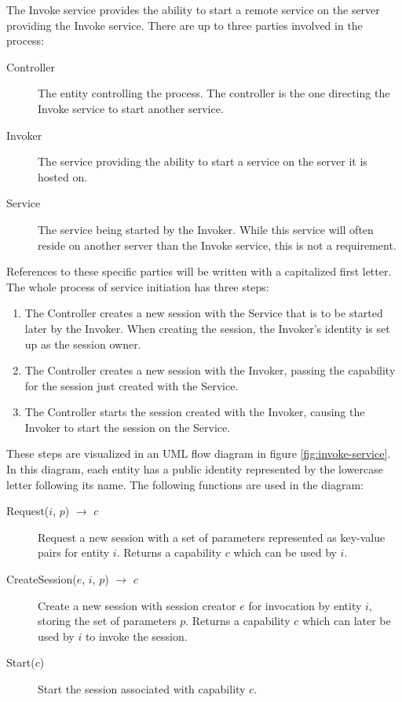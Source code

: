 The Invoke service provides the ability to start a remote service on the server providing the Invoke service.
There are up to three parties involved in the process:
\begin{description}
    \item[Controller]
        The entity controlling the process.
        The controller is the one directing the Invoke service to start another service.
    \item[Invoker]
        The service providing the ability to start a service on the server it is hosted on.
    \item[Service]
        The service being started by the Invoker.
        While this service will often reside on another server than the Invoke service, this is not a requirement.
\end{description}

References to these specific parties will be written with a capitalized first letter.
The whole process of service initiation has three steps:
\begin{enumerate}
    \item The Controller creates a new session with the Service that is to be started later by the Invoker.
        When creating the session, the Invoker's identity is set up as the session owner.
    \item The Controller creates a new session with the Invoker, passing the capability for the session just created with the Service.
    \item The Controller starts the session created with the Invoker, causing the Invoker to start the session on the Service.
\end{enumerate}

These steps are visualized in an UML flow diagram in figure \ref{fig:invoke-service}.
In this diagram, each entity has a public identity represented by the lowercase letter following its name.
The following functions are used in the diagram:
\begin{description}
    \item[Request($i$, $p$) $\rightarrow$ $c$]
        Request a new session with a set of parameters represented as key-value pairs for entity $i$.
        Returns a capability $c$ which can be used by $i$.
    \item[CreateSession($e$, $i$, $p$) $\rightarrow$ $c$]
        Create a new session with session creator $e$ for invocation by entity $i$, storing the set of parameters $p$.
        Returns a capability $c$ which can later be used by $i$ to invoke the session.
    \item[Start($c$)]
        Start the session associated with capability $c$.
\end{description}

